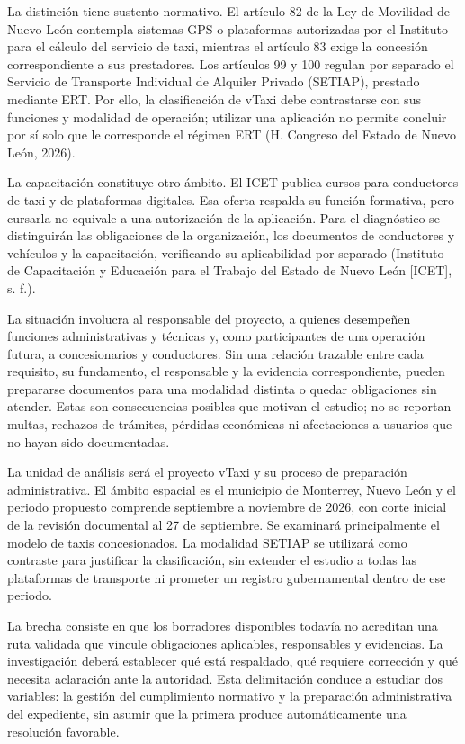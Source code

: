 {La distinción tiene sustento normativo. El artículo 82 de la Ley de Movilidad de Nuevo León contempla sistemas GPS o plataformas autorizadas por el Instituto para el cálculo del servicio de taxi, mientras el artículo 83 exige la concesión correspondiente a sus prestadores. Los artículos 99 y 100 regulan por separado el Servicio de Transporte Individual de Alquiler Privado (SETIAP), prestado mediante ERT. Por ello, la clasificación de vTaxi debe contrastarse con sus funciones y modalidad de operación; utilizar una aplicación no permite concluir por sí solo que le corresponde el régimen ERT (H. Congreso del Estado de Nuevo León, 2026).


La capacitación constituye otro ámbito. El ICET publica cursos para conductores de taxi y de plataformas digitales. Esa oferta respalda su función formativa, pero cursarla no equivale a una autorización de la aplicación. Para el diagnóstico se distinguirán las obligaciones de la organización, los documentos de conductores y vehículos y la capacitación, verificando su aplicabilidad por separado (Instituto de Capacitación y Educación para el Trabajo del Estado de Nuevo León [ICET], s. f.).


La situación involucra al responsable del proyecto, a quienes desempeñen funciones administrativas y técnicas y, como participantes de una operación futura, a concesionarios y conductores. Sin una relación trazable entre cada requisito, su fundamento, el responsable y la evidencia correspondiente, pueden prepararse documentos para una modalidad distinta o quedar obligaciones sin atender. Estas son consecuencias posibles que motivan el estudio; no se reportan multas, rechazos de trámites, pérdidas económicas ni afectaciones a usuarios que no hayan sido documentadas.


La unidad de análisis será el proyecto vTaxi y su proceso de preparación administrativa. El ámbito espacial es el municipio de Monterrey, Nuevo León y el periodo propuesto comprende septiembre a noviembre de 2026, con corte inicial de la revisión documental al 27 de septiembre. Se examinará principalmente el modelo de taxis concesionados. La modalidad SETIAP se utilizará como contraste para justificar la clasificación, sin extender el estudio a todas las plataformas de transporte ni prometer un registro gubernamental dentro de ese periodo.


La brecha consiste en que los borradores disponibles todavía no acreditan una ruta validada que vincule obligaciones aplicables, responsables y evidencias. La investigación deberá establecer qué está respaldado, qué requiere corrección y qué necesita aclaración ante la autoridad. Esta delimitación conduce a estudiar dos variables: la gestión del cumplimiento normativo y la preparación administrativa del expediente, sin asumir que la primera produce automáticamente una resolución favorable.


}
